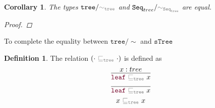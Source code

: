 \documentclass[twoside,11pt,openright]{report}
\theoremstyle{plain} %
\newtheorem*{cor}{Corollary}
\theoremstyle{definition}
\newtheorem{defn}{Definition}[section]
\theoremstyle{remark}
\newcommand*{\relation}[1]{\textcolor{gray}{\ensuremath{\mathtt{#1}}}}
\newcommand*{\constructor}[1]{\textcolor{purple!60!black}{\ensuremath{\mathtt{#1}}}}
\newcommand*{\typeformer}[1]{\ensuremath{\mathtt{#1}}}
\begin{document}
\begin{cor}
  The types \(\typeformer{tree}/\relation{\sim_{tree}}\) and \(\typeformer{Seq}_{tree} / \relation{\sim_{\typeformer{Seq}_{tree}}}\) are equal.
  \begin{proof}
    
  \end{proof}
\end{cor}
To complete the equality between \(\typeformer{tree}/{\sim}\) and \(\typeformer{sTree}\)
\begin{defn}
  The relation \((\cdot~\relation{\sqsubseteq_{tree}}~\cdot)\) is defined as
  \begin{equation}
    \infer{\constructor{leaf}~\relation{\sqsubseteq_{tree}}~x}{x : tree}
  \end{equation}
  \begin{equation}
    \infer{\constructor{leaf}~\relation{\sqsubseteq_{tree}}~x}{}
  \end{equation}
  \begin{equation}
    x~\relation{\sqsubseteq_{tree}}~x
  \end{equation}
\end{defn}
\end{document}
